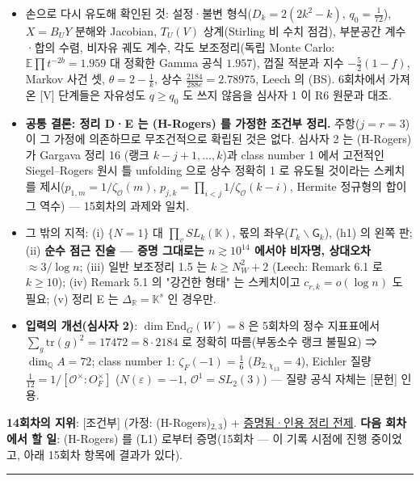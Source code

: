 \begin{itemize}
\tightlist
\item
  손으로 다시 유도해 확인된 것: 설정·불변 형식(\(D_k=2(2k^2-k)\), \(q_0=\frac1{72}\)), \(X=B_UY\) 분해와 Jacobian, \(T_U(V)\) 상계(Stirling 비 수치 점검), 부분공간 계수·합의 수렴, 비자유 궤도 계수, 각도 보조정리(독립 Monte Carlo: \(\mathbb E\prod t^{-2b}=1.959\) 대 정확한 Gamma 공식 \(1.957\)), 껍질 적분과 지수 \(-\frac52(1-f)\), Markov 사건 셋, \(\theta=2-\frac1k\), 상수 \(\frac{2184}{288e}=2.78975\), Leech 의 (BS). 6회차에서 가져온 {[}V{]} 단계들은 자유성도 \(q\ge q_0\) 도 쓰지 않음을 심사자 1 이 R6 원문과 대조.
\item
  \textbf{공통 결론: 정리 D·E 는 (H-Rogers) 를 가정한 조건부 정리.} 주항(\(j=r=3\))이 그 가정에 의존하므로 무조건적으로 확립된 것은 없다. 심사자 2 는 (H-Rogers) 가 Gargava 정리 16 (랭크 \(k-j+1,\dots,k\))과 class number 1 에서 고전적인 Siegel--Rogers 원시 틀 unfolding 으로 상수 정확히 1 로 유도될 것이라는 스케치를 제시(\(p_{1,m}=1/\zeta_{\mathcal O}(m)\), \(p_{j,k}=\prod_{i<j}1/\zeta_{\mathcal O}(k-i)\), Hermite 정규형의 합이 그 역수) --- 15회차의 과제와 일치.
\item
  그 밖의 지적: (i) \(\{N=1\}\) 대 \(\prod_vSL_k(\mathbb K)\), 몫의 좌우(\(\Gamma_k\backslash\mathsf G_k\)), (h1) 의 왼쪽 판; (ii) \textbf{순수 점근 진술 --- 증명 그대로는 \(n\gtrsim10^{14}\) 에서야 비자명, 상대오차 \(\approx3/\log n\)}; (iii) 일반 보조정리 1.5 는 \(k\ge N_W^2+2\) (Leech: Remark 6.1 로 \(k\ge10\)); (iv) Remark 5.1 의 "강건한 형태" 는 스케치이고 \(c_{r,k}=o(\log n)\) 도 필요; (v) 정리 E 는 \(\Delta_\mathbb R=\mathbb K^s\) 인 경우만.
\item
  \textbf{입력의 개선(심사자 2)}: \(\dim\mathrm{End}_G(W)=8\) 은 5회차의 정수 지표표에서 \(\sum_g\mathrm{tr}(g)^2=17472=8\cdot2184\) 로 정확히 따름(부동소수 랭크 불필요) ⇒ \(\dim_\mathbb QA=72\); class number 1: \(\zeta_F(-1)=\frac16\) (\(B_{2,\chi_{13}}=4\)), Eichler 질량 \(\frac1{12}=1/[\mathcal O^\times:O_F^\times]\) (\(N(\varepsilon)=-1\), \(\mathcal O^1=SL_2(3)\)) --- 질량 공식 자체는 {[}문헌{]} 인용.
\end{itemize}

\textbf{14회차의 지위}: {[}조건부{]} (가정: (H-Rogers)\(_{2,3}\)) + \href{나머지\%20전부;\%20AI\%20심사\%202회}{증명됨·인용 정리 전제}. \textbf{다음 회차에서 할 일}: (H-Rogers) 를 (L1) 로부터 증명(15회차 --- 이 기록 시점에 진행 중이었고, 아래 15회차 항목에 결과가 있다).

\begin{center}\rule{0.5\linewidth}{0.5pt}\end{center}

